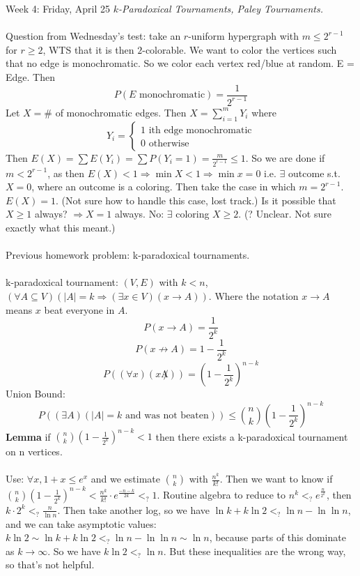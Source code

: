 \documentclass[12pt]{article}
\theoremstyle{remark}
\newcommand{\ow}{\text{ otherwise }}
\begin{document}
\newpage
\label{12}\begin{section}{Week 4: Friday, April 25}
\indent\textit{$k$-Paradoxical Tournaments, Paley Tournaments.}\\\\
Question from Wednesday's test: take an $r$-uniform hypergraph with $m \leq 2^{r-1}$ for $r \geq 2$, WTS that it is then $2$-colorable. We want to color the vertices such that no edge is monochromatic. So we color each vertex red/blue at random. E = Edge. Then $$P(E\text{ monochromatic}) = \frac1 {2^{r-1}}$$ Let $X = \#$ of monochromatic edges. Then $X = \sum_{i=1}^m Y_i$ where $$Y_i = \begin{cases}1\text{ ith edge monochromatic}\\0\ow\end{cases}$$
Then $E(X) = \sum E(Y_i) = \sum P(Y_i = 1) = \frac m {2^{r-1}} \leq 1$. So we are done if $m < 2^{r-1}$, as then $E(X) < 1 \Rightarrow \min X < 1 \Rightarrow \min x = 0$ i.e. $\exists$ outcome s.t. $X=0$, where an outcome is a coloring. Then take the case in which $m=2^{r-1}$. $E(X) = 1$. (Not sure how to handle this case, lost track.) Is it possible that $X \geq 1$ always? $\Rightarrow X=1$ always. No: $\exists$ coloring $X \geq 2$. (? Unclear. Not sure exactly what this meant.)
\\\\Previous homework problem:
k-paradoxical tournaments.
\\\\
k-paradoxical tournament: $(V,E)$ with $k < n$, $(\forall A \subseteq V)(|A| = k \Rightarrow (\exists x \in V)(x \to A))$. Where the notation $x\to A$ means $x$ beat everyone in $A$.
$$P(x \to A) = \frac 1 {2^k}$$ $$P(x \not \to A) = 1- \frac 1{2^k}$$
$$P((\forall x)(x \not A)) = \left(1-\frac 1{2^k}\right)^{n-k}$$
Union Bound:
$$P((\exists A)(|A| = k \text{ and was not beaten})) \leq {n \choose k}\left(1-\frac 1{2^k}\right)^{n-k}$$
\textbf{Lemma} if ${n \choose k}\left(1-\frac 1{2^k}\right)^{n-k} < 1$ then there exists a k-paradoxical tournament on n vertices.
\\\\Use: $\forall x, 1+x \leq e^x$ and we estimate ${n \choose k}$ with $\frac{n^k}{k!}$. Then we want to know if ${n \choose k}\left(1-\frac 1{2^k}\right)^{n-k} < \frac{n^k}{k!} \cdot e^{\frac{-n-k}{2k}} <_? 1$. Routine algebra to reduce to $n^k <_? e^{\frac n {2^k}}$, then $k \cdot 2^k <_? \frac{n}{\ln n}$. Then take another log, so we have $\ln k + k \ln 2 <_? \ln n - \ln \ln n$, and we can take asymptotic values:$k \ln 2 \sim \ln k + k \ln 2 <_? \ln n - \ln \ln n \sim \ln n$, because parts of this dominate as $k \to \infty$. So we have $k \ln 2 <_? \ln n$. But these inequalities are the wrong way, so that's not helpful.

\end{section}
\end{document}
